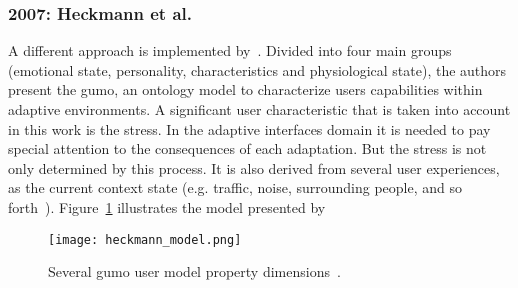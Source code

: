 
\subsubsection{2007: Heckmann et al.}
\label{sec:heckmann}

A different approach is implemented by~\citet{heckmann_gumogeneral_2005}.
Divided into four main groups (emotional state, personality, characteristics and
physiological state), the authors present the \acf{gumo}, an ontology model to 
characterize users capabilities within adaptive environments. A significant 
user characteristic that is taken into account in this work is the stress. In the 
adaptive interfaces domain it is needed to pay special attention to the 
consequences of each adaptation. But the stress is not only determined  by this 
process. It is also derived from several user experiences, as the current 
context state (e.g. traffic, noise, surrounding people, and so 
forth~\citep{babisch_noise_stress_2002}). Figure~\ref{fig:heckmann_model} illustrates
the model presented by~\citeauthor{heckmann_gumogeneral_2005}


\begin{figure}
\centering
\texttt{[image: heckmann\_model.png]}
\caption{Several \ac{gumo} user model property
dimensions~\citep{heckmann_gumogeneral_2005}.}
\label{fig:heckmann_model}
\end{figure}

